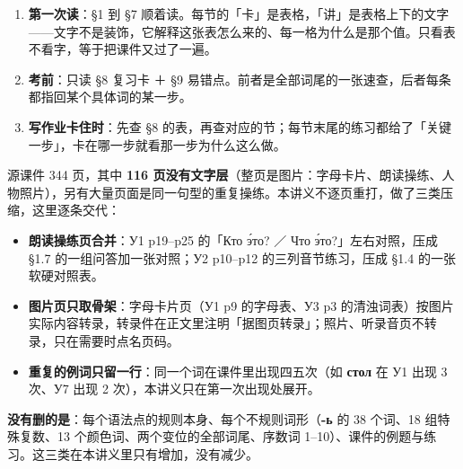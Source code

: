 

\begin{enumerate}
\item \textbf{第一次读}：§1 到 §7 顺着读。每节的「卡」是表格，「讲」是表格上下的文字——文字不是装饰，它解释这张表怎么来的、每一格为什么是那个值。只看表不看字，等于把课件又过了一遍。
\item \textbf{考前}：只读 \S8 复习卡 ＋ \S9 易错点。前者是全部词尾的一张速查，后者每条都指回某个具体词的某一步。
\item \textbf{写作业卡住时}：先查 \S8 的表，再查对应的节；每节末尾的练习都给了「关键一步」，卡在哪一步就看那一步为什么这么做。
\end{enumerate}


源课件 344 页，其中 \textbf{116 页没有文字层}（整页是图片：字母卡片、朗读操练、人物照片），另有大量页面是同一句型的重复操练。本讲义不逐页重打，做了三类压缩，这里逐条交代：

\begin{itemize}
\item \textbf{朗读操练页合并}：У1 p19--p25 的「Кто э́то? ／ Что э́то?」左右对照，压成 \S1.7 的一组问答加一张对照；У2 p10--p12 的三列音节练习，压成 \S1.4 的一张软硬对照表。
\item \textbf{图片页只取骨架}：字母卡片页（У1 p9 的字母表、У3 p3 的清浊词表）按图片实际内容转录，转录件在正文里注明「据图页转录」；照片、听录音页不转录，只在需要时点名页码。
\item \textbf{重复的例词只留一行}：同一个词在课件里出现四五次（如 \textbf{стол} 在 У1 出现 3 次、У7 出现 2 次），本讲义只在第一次出现处展开。
\end{itemize}

\textbf{没有删的是}：每个语法点的规则本身、每个不规则词形（\textbf{-ь} 的 38 个词、18 组特殊复数、13 个颜色词、两个变位的全部词尾、序数词 1--10）、课件的例题与练习。这三类在本讲义里只有增加，没有减少。
